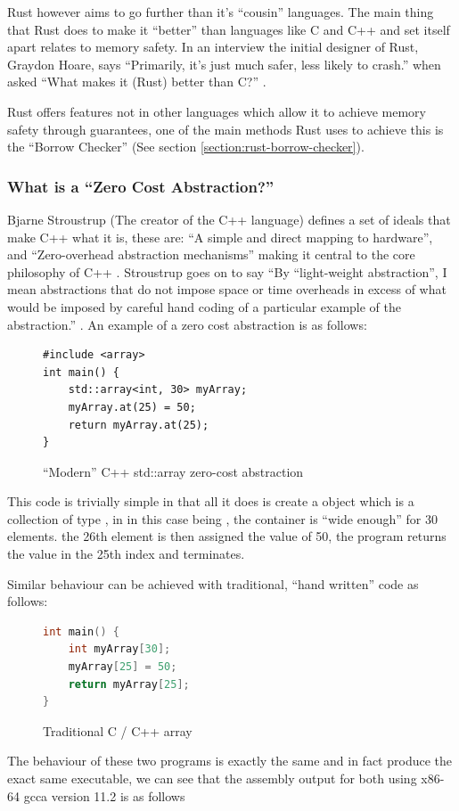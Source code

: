 \documentclass[a4paper]{article}
\begin{document}
Rust however aims to go further than it's ``cousin'' languages. The main thing that Rust does to make it ``better'' than languages like C and C++ and set itself apart relates to memory safety. In an interview the initial designer of Rust, Graydon Hoare, says ``Primarily, it's just much safer, less likely to crash.'' when asked ``What makes it (Rust) better than C?'' \parencite{rust-interview}.

Rust offers features not in other languages which allow it to achieve memory safety through guarantees, one of the main methods Rust uses to achieve this is the ``Borrow Checker'' (See section \ref{section:rust-borrow-checker}).
\subsubsection{What is a ``Zero Cost Abstraction?''}
Bjarne Stroustrup (The creator of the C++ language) defines a set of ideals that make C++ what it is, these are: ``A simple and direct mapping to hardware'', and ``Zero-overhead abstraction mechanisms'' making it central to the core philosophy of C++ \parencite{stroustrup-presentation}. Stroustrup goes on to say ``By ``light-weight abstraction'', I mean abstractions that do not impose space or time overheads in excess of what would be imposed by careful hand coding of a particular example of the abstraction.'' \parencite{stroustrup-presentation}. An example of a zero cost abstraction is as follows:

\begin{figure}[H]
	\begin{lstlisting}
#include <array>
int main() {
    std::array<int, 30> myArray;
    myArray.at(25) = 50;
    return myArray.at(25);
}
				\end{lstlisting}
	\caption{``Modern'' C++ std::array zero-cost abstraction}
\label{figure:c++-zero-cost-abstraction}
\end{figure}

This code is trivially simple in that all it does is create a  object which is a collection of type ,  in in this case being , the container is ``wide enough'' for 30 elements. the 26th element is then assigned the value of 50, the program returns the value in the 25th index and terminates.

Similar behaviour can be achieved with traditional, ``hand written'' code as follows:
\begin{figure}[H]
	\begin{lstlisting}[language=c++]
int main() {
    int myArray[30];
    myArray[25] = 50;
    return myArray[25];
}
				\end{lstlisting}
	\caption{Traditional C / C++ array}
\label{figure:c++-traditional-array}
\end{figure}
The behaviour of these two programs is exactly the same and in fact produce the exact same executable, we can see that the assembly output for both using x86-64 \gls{gcca} version 11.2 is as follows
\end{document}
